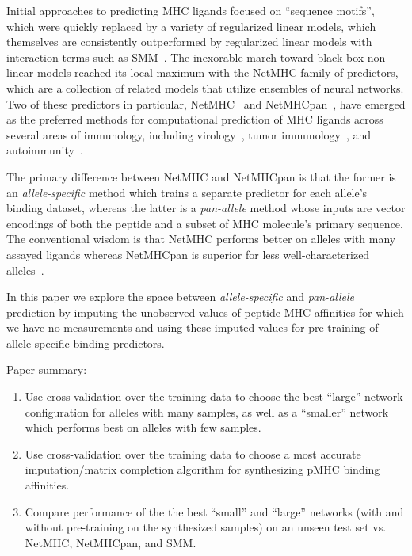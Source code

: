 Initial approaches to predicting MHC ligands focused on ``sequence motifs''\cite{Sette_1989}, which were quickly replaced by a variety of regularized linear models, which themselves are consistently outperformed by regularized linear models with interaction terms such as SMM~\cite{Peters_2003}. The inexorable march toward black box non-linear models reached its local maximum with the NetMHC family of predictors, which are a collection of related models that utilize ensembles of neural networks. Two of these predictors in particular, NetMHC~\cite{Lundegaard_2008} and NetMHCpan~\cite{Nielsen_2007}, have emerged as the preferred methods for computational prediction of MHC ligands across several areas of immunology, including virology~\cite{Lund_2011}, tumor immunology~\cite{Gubin_2015}, and autoimmunity~\cite{Abreu_2012}. 

The primary difference between NetMHC and NetMHCpan is that the former is an {\it allele-specific} method which trains a separate predictor for each allele's binding dataset, whereas the latter is a {\it pan-allele} method whose inputs are vector encodings of both the peptide and a subset of MHC molecule's primary sequence. The conventional wisdom is that NetMHC performs better on alleles with many assayed ligands whereas NetMHCpan is superior for less well-characterized alleles~\cite{Gfeller_2016}.

In this paper we explore the space between {\it allele-specific} and {\it pan-allele} prediction by imputing the unobserved values of peptide-MHC affinities for which we have no measurements and using these imputed values for pre-training of allele-specific binding predictors.

Paper summary:
\begin{enumerate}
\item Use cross-validation over the training data to choose the best ``large'' network configuration for alleles with many samples, as well as a ``smaller'' network which performs best on alleles with few samples.
\item Use cross-validation over the training data to choose a most accurate imputation/matrix completion algorithm for 
synthesizing pMHC binding affinities.
\item Compare performance of the the best ``small'' and ``large'' networks (with and without pre-training on the synthesized samples) on an unseen test set vs. NetMHC, NetMHCpan, and SMM. 
\end{enumerate}